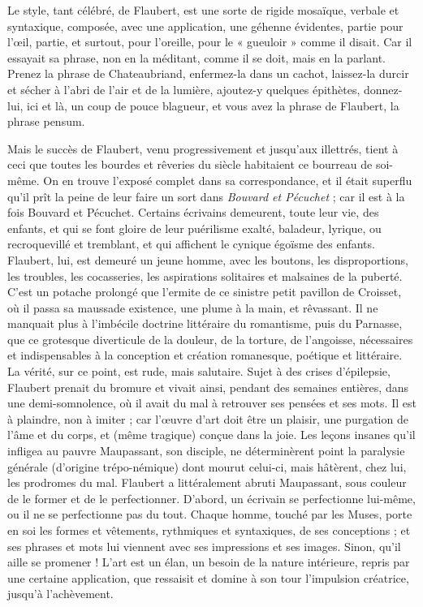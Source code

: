 \documentclass[french,twoside]{book} %
\begin{document}
Le style, tant célébré, de Flaubert, est une sorte de rigide mosaïque, verbale et syntaxique, composée, avec une application, une géhenne évidentes, partie pour l’œil, partie, et surtout, pour l’oreille, pour le « gueuloir » comme il disait. Car il essayait sa phrase, non en la méditant, comme il se doit, mais en la parlant. Prenez la phrase de Chateaubriand, enfermez-la dans un cachot, laissez-la durcir et sécher à l’abri de l’air et de la lumière, ajoutez-y quelques épithètes, donnez-lui, ici et là, un coup de pouce blagueur, et vous avez la phrase de Flaubert, la phrase pensum.\par
Mais le succès de Flaubert, venu progressivement et jusqu’aux illettrés, tient à ceci que toutes les bourdes et rêveries du siècle habitaient ce bourreau de soi-même. On en trouve l’exposé complet dans sa correspondance, et il était superflu qu’il prît la peine de leur faire un sort dans {\itshape Bouvard et Pécuchet} ; car il est à la fois Bouvard et Pécuchet. Certains écrivains demeurent, toute leur vie, des enfants, et qui se font gloire de leur puérilisme exalté, baladeur, lyrique, ou recroquevillé et tremblant, et qui affichent le cynique égoïsme des enfants. Flaubert, lui, est demeuré un jeune homme, avec les boutons, les disproportions, les troubles, les cocasseries, les aspirations solitaires et malsaines de la puberté. C’est un potache prolongé que l’ermite de ce sinistre petit pavillon de Croisset, où il passa sa maussade existence, une plume à la main, et rêvassant. Il ne manquait plus à l’imbécile doctrine littéraire du romantisme, puis du Parnasse, que ce grotesque diverticule de la douleur, de la torture, de l’angoisse, nécessaires et indispensables à la conception et création romanesque, poétique et littéraire. La vérité, sur ce point, est rude, mais salutaire. Sujet à des crises d’épilepsie, Flaubert prenait du bromure et vivait ainsi, pendant des semaines entières, dans une demi-somnolence, où il avait du mal à retrouver ses pensées et ses mots. Il est à plaindre, non à imiter ; car l’œuvre d’art doit être un plaisir, une purgation de l’âme et du corps, et (même tragique) conçue dans la joie. Les leçons insanes qu’il infligea au pauvre Maupassant, son disciple, ne déterminèrent point la paralysie générale (d’origine trépo-némique) dont mourut celui-ci, mais hâtèrent, chez lui, les prodromes du mal. Flaubert a littéralement abruti Maupassant, sous couleur de le former et de le perfectionner. D’abord, un écrivain se perfectionne lui-même, ou il ne se perfectionne pas du tout. Chaque homme, touché par les Muses, porte en soi les formes et vêtements, rythmiques et syntaxiques, de ses conceptions ; et ses phrases et mots lui viennent avec ses impressions et ses images. Sinon, qu’il aille se promener ! L’art est un élan, un besoin de la nature intérieure, repris par une certaine application, que ressaisit et domine à son tour l’impulsion créatrice, jusqu’à l’achèvement.\par
\end{document}
